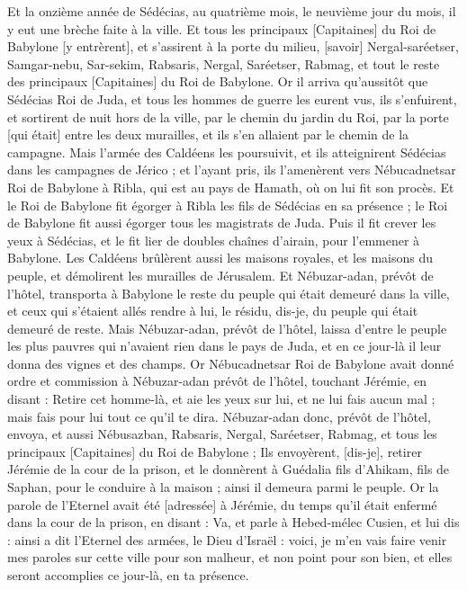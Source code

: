 \begin{multicols}{2}
Et la onzième année de Sédécias, au quatrième mois, le neuvième jour du mois, il y eut une brèche faite à la ville.
Et tous les principaux [Capitaines] du Roi de Babylone [y entrèrent], et s'assirent à la porte du milieu, [savoir] Nergal-saréetser, Samgar-nebu, Sar-sekim, Rabsaris, Nergal, Saréetser, Rabmag, et tout le reste des principaux [Capitaines] du Roi de Babylone.
Or il arriva qu'aussitôt que Sédécias Roi de Juda, et tous les hommes de guerre les eurent vus, ils s'enfuirent, et sortirent de nuit hors de la ville, par le chemin du jardin du Roi, par la porte [qui était] entre les deux murailles, et ils s'en allaient par le chemin de la campagne.
Mais l'armée des Caldéens les poursuivit, et ils atteignirent Sédécias dans les campagnes de Jérico ; et l'ayant pris, ils l'amenèrent vers Nébucadnetsar Roi de Babylone à Ribla, qui est au pays de Hamath, où on lui fit son procès.
Et le Roi de Babylone fit égorger à Ribla les fils de Sédécias en sa présence ; le Roi de Babylone fit aussi égorger tous les magistrats de Juda.
Puis il fit crever les yeux à Sédécias, et le fit lier de doubles chaînes d'airain, pour l'emmener à Babylone.
Les Caldéens brûlèrent aussi les maisons royales, et les maisons du peuple, et démolirent les murailles de Jérusalem.
Et Nébuzar-adan, prévôt de l'hôtel, transporta à Babylone le reste du peuple qui était demeuré dans la ville, et ceux qui s'étaient allés rendre à lui, le résidu, dis-je, du peuple qui était demeuré de reste.
Mais Nébuzar-adan, prévôt de l'hôtel, laissa d'entre le peuple les plus pauvres qui n'avaient rien dans le pays de Juda, et en ce jour-là il leur donna des vignes et des champs.
Or Nébucadnetsar Roi de Babylone avait donné ordre et commission à Nébuzar-adan prévôt de l'hôtel, touchant Jérémie, en disant :
Retire cet homme-là, et aie les yeux sur lui, et ne lui fais aucun mal ; mais fais pour lui tout ce qu'il te dira.
Nébuzar-adan donc, prévôt de l'hôtel, envoya, et aussi Nébusazban, Rabsaris, Nergal, Saréetser, Rabmag, et tous les principaux [Capitaines] du Roi de Babylone ;
Ils envoyèrent, [dis-je], retirer Jérémie de la cour de la prison, et le donnèrent à Guédalia fils d'Ahikam, fils de Saphan, pour le conduire à la maison ; ainsi il demeura parmi le peuple.
Or la parole de l'Eternel avait été [adressée] à Jérémie, du temps qu'il était enfermé dans la cour de la prison, en disant :
Va, et parle à Hebed-mélec Cusien, et lui dis : ainsi a dit l'Eternel des armées, le Dieu d'Israël : voici, je m'en vais faire venir mes paroles sur cette ville pour son malheur, et non point pour son bien, et elles seront accomplies ce jour-là, en ta présence.

\end{multicols}
